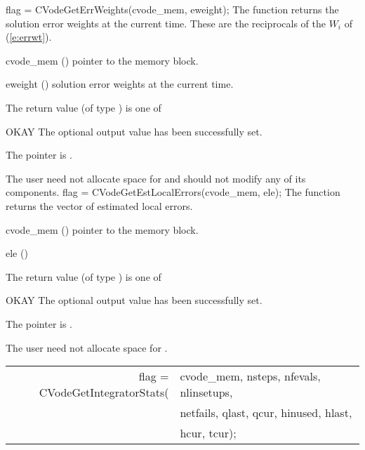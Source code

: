 {}
{
  flag = CVodeGetErrWeights(cvode\_mem, eweight);
}
{
  The function  returns the solution error weights 
  at the current time. These are the reciprocals of the $W_i$ of (\ref{e:errwt}).
}
{
  \begin{args}
  \item[cvode\_mem] ()
    pointer to the {\cvode} memory block.
  \item[eweight] ()
    solution error weights at the current time.
  \end{args}
}
{
  The return value  (of type ) is one of
  \begin{args}
  \item[OKAY] 
    The optional output value has been successfully set.
  \item[\Id{CVG\_NO\_MEM}]
    The  pointer is .
  \end{args}
}
{
  The user need not allocate space for  and should not modify
  any of its components.
}
{
  flag = CVodeGetEstLocalErrors(cvode\_mem, ele);
}
{
  The function  returns the
  vector of estimated local errors.
}
{
  \begin{args}
  \item[cvode\_mem] ()
    pointer to the {\cvode} memory block.
  \item[ele] ()
    
  \end{args}
}
{
  The return value  (of type ) is one of
  \begin{args}
  \item[OKAY] 
    The optional output value has been successfully set.
  \item[\Id{CVG\_NO\_MEM}]
    The  pointer is .
  \end{args}
}
{
  The user need not allocate space for .
}
{
  \begin{tabular}[t]{@{}r@{}l@{}}
    flag = CVodeGetIntegratorStats(&cvode\_mem, nsteps, nfevals, nlinsetups, \\
                                   &netfails, qlast, qcur, hinused, hlast, \\
                                   &hcur, tcur);
  \end{tabular}
}
